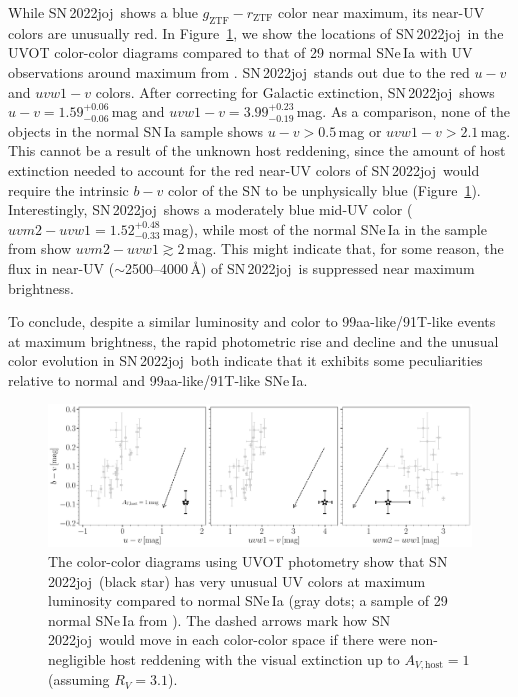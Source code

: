 \documentclass[twocolumn]{aastex631}
\newcommand{\sn}{SN\,2022joj}
\begin{document}
\begin{CJK*}{UTF8}{gbsn}
While \sn\ shows a blue $g_\mathrm{ZTF}-r_\mathrm{ZTF}$ color near maximum, its near-UV colors are unusually red. In Figure~\ref{fig:UVOT}, we show the locations of \sn\ in the UVOT color-color diagrams compared to that of 29 normal SNe\,Ia with UV observations around maximum from \citet{Brown_2018}. \sn\ stands out due to the red $u-v$ and $uvw1-v$ colors. After correcting for Galactic extinction, \sn\ shows $u-v=1.59^{+0.06}_{-0.06}$\,mag and $uvw1 - v=3.99^{+0.23}_{-0.19}$\,mag. As a comparison, none of the objects in the normal SN\,Ia sample shows $u-v>0.5$\,mag or $uvw1 - v>2.1$\,mag. This cannot be a result of the unknown host reddening, since the amount of host extinction needed to account for the red near-UV colors of \sn\ would require the intrinsic $b-v$ color of the SN to be unphysically blue (Figure~\ref{fig:UVOT}). Interestingly, \sn\ shows a moderately blue mid-UV color ($uvm2-uvw1=1.52^{+0.48}_{-0.33}$\,mag), while most of the normal SNe\,Ia in the sample from \citet{Brown_2018} show $uvm2-uvw1\gtrsim2$\,mag. This might indicate that, for some reason, the flux in near-UV ($\sim$2500--4000\,\r{A}) of \sn\ is suppressed near maximum brightness.

To conclude, despite a similar luminosity and color to 99aa-like/91T-like events at maximum brightness, the rapid photometric rise and decline and the unusual color evolution in \sn\ both indicate that it exhibits some peculiarities relative to normal and 99aa-like/91T-like SNe\,Ia.

\begin{figure}
    \centering
    \includegraphics[width=\linewidth]{UVOT_colors.pdf}
    \caption{The color-color diagrams using UVOT photometry show that \sn\ (black star) has very unusual UV colors at maximum luminosity compared to normal SNe\,Ia (gray dots; a sample of 29 normal SNe\,Ia from \citealp{Brown_2018}). The dashed arrows mark how \sn\ would move in each color-color space if there were non-negligible host reddening with the visual extinction up to $A_{V,\mathrm{host}}=1$ (assuming $R_V=3.1$). 
    }
    \label{fig:UVOT}
\end{figure}



\end{CJK*}
\end{document}
